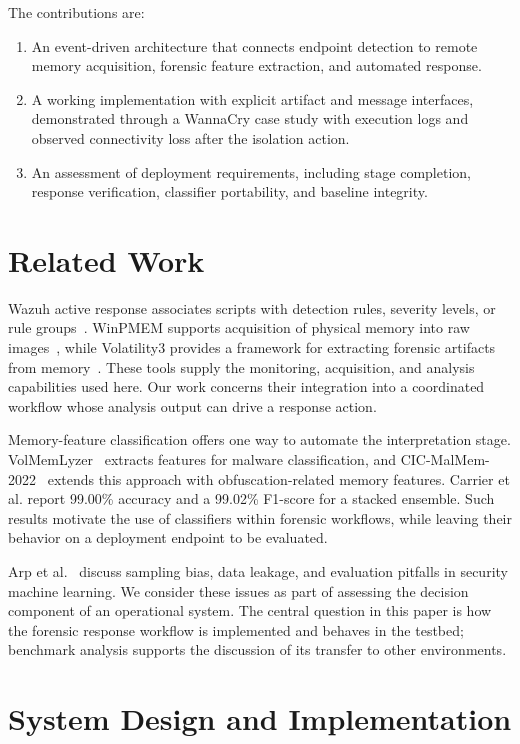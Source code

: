 \documentclass[conference]{IEEEtran}
\begin{document}
The contributions are:
\begin{enumerate}
\item An event-driven architecture that connects endpoint detection to remote memory acquisition, forensic feature extraction, and automated response. 
\item A working implementation with explicit artifact and message interfaces, demonstrated through a WannaCry case study with execution logs and observed connectivity loss after the isolation action.
\item An assessment of deployment requirements, including stage completion, response verification, classifier portability, and baseline integrity.
\end{enumerate}

\section{Related Work}

Wazuh active response associates scripts with detection rules, severity levels, or rule groups~\cite{wazuh}. WinPMEM supports acquisition of physical memory into raw images~\cite{winpmem}, while Volatility3 provides a framework for extracting forensic artifacts from memory~\cite{volatility}. These tools supply the monitoring, acquisition, and analysis capabilities used here. Our work concerns their integration into a coordinated workflow whose analysis output can drive a response action.

Memory-feature classification offers one way to automate the interpretation stage. VolMemLyzer~\cite{lashkari2021} extracts features for malware classification, and CIC-MalMem-2022~\cite{carrier2022} extends this approach with obfuscation-related memory features. Carrier et al. report 99.00\% accuracy and a 99.02\% F1-score for a stacked ensemble. Such results motivate the use of classifiers within forensic workflows, while leaving their behavior on a deployment endpoint to be evaluated.

Arp et al.~\cite{arp2022} discuss sampling bias, data leakage, and evaluation pitfalls in security machine learning. We consider these issues as part of assessing the decision component of an operational system. The central question in this paper is how the forensic response workflow is implemented and behaves in the testbed; benchmark analysis supports the discussion of its transfer to other environments.

\section{System Design and Implementation}
\label{sec:architecture}
\end{document}
